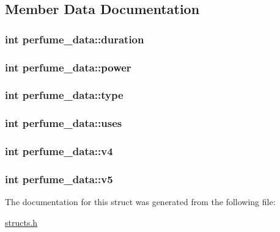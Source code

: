 \subsection{Member Data Documentation}
\hypertarget{structperfume__data_a526f9cb6959dfc909bdfc4910400c678}{
\subsubsection[{duration}]{\setlength{\rightskip}{0pt plus 5cm}int perfume\-\_\-data\-::duration}}\label{structperfume__data_a526f9cb6959dfc909bdfc4910400c678}
\hypertarget{structperfume__data_a3ab57bd4c3213b26186b463eb05b3964}{
\subsubsection[{power}]{\setlength{\rightskip}{0pt plus 5cm}int perfume\-\_\-data\-::power}}\label{structperfume__data_a3ab57bd4c3213b26186b463eb05b3964}
\hypertarget{structperfume__data_a7ecadab65c8d45a95ebda20b74bb5bde}{
\subsubsection[{type}]{\setlength{\rightskip}{0pt plus 5cm}int perfume\-\_\-data\-::type}}\label{structperfume__data_a7ecadab65c8d45a95ebda20b74bb5bde}
\hypertarget{structperfume__data_abd44f553157c34ce18af6876c89960c4}{
\subsubsection[{uses}]{\setlength{\rightskip}{0pt plus 5cm}int perfume\-\_\-data\-::uses}}\label{structperfume__data_abd44f553157c34ce18af6876c89960c4}
\hypertarget{structperfume__data_ad488be1925bcd5a83f8aaddd81957967}{
\subsubsection[{v4}]{\setlength{\rightskip}{0pt plus 5cm}int perfume\-\_\-data\-::v4}}\label{structperfume__data_ad488be1925bcd5a83f8aaddd81957967}
\hypertarget{structperfume__data_a6909dc4467b01c80d5173394556c26fc}{
\subsubsection[{v5}]{\setlength{\rightskip}{0pt plus 5cm}int perfume\-\_\-data\-::v5}}\label{structperfume__data_a6909dc4467b01c80d5173394556c26fc}


The documentation for this struct was generated from the following file\-:\begin{DoxyCompactItemize}
\item 
\hyperlink{structs_8h}{structs.\-h}\end{DoxyCompactItemize}
